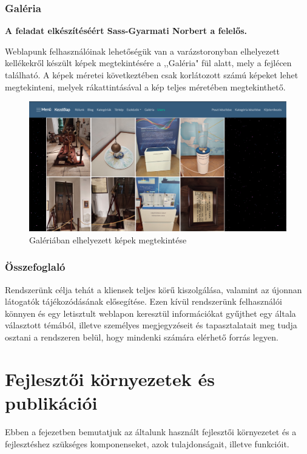\documentclass[
]{thesis-ekf}
\theoremstyle{definition}
\theoremstyle{remark}
\begin{document}
		\subsection{Galéria}
			\textbf{A feladat elkészítéséért Sass-Gyarmati Norbert a felelős.} 
			\par Weblapunk felhasználóinak lehetőségük van a varázstoronyban elhelyezett kellékekről készült képek megtekintésére a ,,Galéria" fül alatt, mely a fejlécen található. A képek méretei következtében csak korlátozott számú képeket lehet megtekinteni, melyek rákattintásával a kép teljes méretében megtekinthető. 
			\begin{figure}[ht]
				\centering
				\includegraphics[scale=0.30]{./images/gallery}
				\caption{Galériában elhelyezett képek megtekintése}
				\label{fig:contactme}
			\end{figure}
		\subsection{Összefoglaló}
			\par Rendszerünk célja tehát a kliensek teljes körű kiszolgálása, valamint az újonnan látogatók tájékozódásának elősegítése. Ezen kívül rendszerünk felhasználói könnyen és egy letisztult weblapon keresztül információkat gyűjthet egy általa választott témából, illetve személyes megjegyzéseit és  tapasztalatait meg tudja osztani a rendszeren belül, hogy mindenki számára elérhető forrás legyen.

\chapter{Fejlesztői környezetek és publikációi}
	\par Ebben a fejezetben bemutatjuk az általunk használt fejlesztői környezetet és a fejlesztéshez szükséges komponenseket, azok tulajdonságait, illetve funkcióit.
\end{document}
